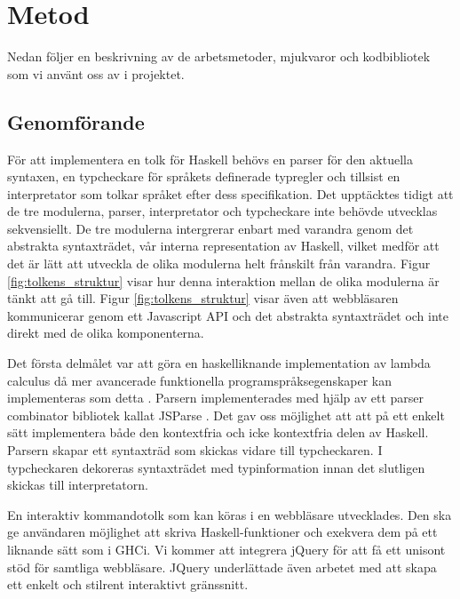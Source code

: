 \section{Metod} 

Nedan följer en beskrivning av de arbetsmetoder, mjukvaror och kodbibliotek som vi använt oss av i projektet. 

\subsection{Genomförande}

För att implementera en tolk för Haskell behövs en parser för den aktuella syntaxen, en typcheckare för språkets definerade typregler och tillsist en interpretator som tolkar språket efter dess specifikation.
Det upptäcktes tidigt att de tre modulerna, parser, interpretator och typcheckare inte behövde utvecklas sekvensiellt. De tre modulerna intergrerar enbart med varandra genom det abstrakta syntaxträdet, vår interna representation av Haskell, vilket medför att det är lätt att utveckla de olika modulerna helt frånskilt från varandra. Figur \ref{fig:tolkens_struktur} visar hur denna interaktion mellan de olika modulerna är tänkt att gå till. Figur \ref{fig:tolkens_struktur} visar även att webbläsaren kommunicerar genom ett Javascript API och det abstrakta syntaxträdet och inte direkt med de olika komponenterna. 

Det första delmålet var att göra en haskelliknande implementation av lambda calculus då mer avancerade funktionella programspråksegenskaper kan implementeras som detta \citep{jones87}.
Parsern implementerades med hjälp av ett parser combinator bibliotek kallat JSParse \citep{jsparse}. Det gav oss möjlighet att att på ett enkelt sätt implementera både den kontextfria och icke kontextfria delen av Haskell. Parsern skapar ett syntaxträd som skickas vidare till typcheckaren. I typcheckaren dekoreras syntaxträdet med typinformation innan det slutligen skickas till interpretatorn.

En interaktiv kommandotolk som kan köras i en webbläsare utvecklades. Den ska ge användaren möjlighet att skriva Haskell-funktioner och exekvera dem på ett liknande sätt som i GHCi. 
Vi kommer att integrera jQuery \citep{jquery} för att få ett unisont stöd för samtliga webbläsare. JQuery underlättade även arbetet med att skapa ett enkelt och stilrent interaktivt gränssnitt.


